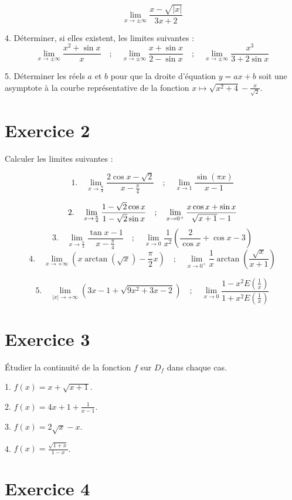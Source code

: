 \documentclass[12pt]{article}
\begin{document}
\[
\lim_{x \to \pm \infty} \frac{x - \sqrt{|x|}}{3x + 2}
\]

4. Déterminer, si elles existent, les limites suivantes :
\[
\lim_{x \to \pm \infty} \frac{x^2 + \sin x}{x} \quad ; \quad \lim_{x \to \pm\infty} \frac{x + \sin x}{2 - \sin x} \quad ; \quad \lim_{x \to \pm \infty} \frac{x^3}{3 + 2 \sin x}
\]

5. Déterminer les réels \( a \) et \( b \) pour que la droite d'équation \( y = ax + b \) soit une asymptote à la courbe représentative de la fonction \( x \mapsto \sqrt{x^2 + 4} - \frac{x}{\sqrt{2}} \).

\section*{Exercice 2}

Calculer les limites suivantes :

\[
1. \quad \lim_{x \to \frac{\pi}{4}} \frac{2 \cos x - \sqrt{2}}{x - \frac{\pi}{4}} \quad ; \quad \lim_{x \to 1} \frac{\sin(\pi x)}{x - 1}
\]

\[
2. \quad \lim_{x \to \frac{\pi}{4}} \frac{1 - \sqrt{2} \cos x}{1 - \sqrt{2} \sin x} \quad ; \quad \lim_{x \to 0^+} \frac{x \cos x + \sin x}{\sqrt{x + 1} - 1} \\
\]
\[
3. \quad \lim_{x \to \frac{\pi}{4}} \frac{\tan x - 1}{x - \frac{\pi}{4}} \quad ; \quad \lim_{x \to 0} \frac{1}{x^2} \left( \frac{2}{\cos x }+ \cos x - 3 \right)
\]
\[
4. \quad \lim_{x \to +\infty} \left( x \arctan (\sqrt{x}) - \frac{\pi}{2} x \right) \quad ; \quad \lim_{x \to 0^+} \frac{1}{x} \arctan \left( \frac{\sqrt{x}}{x + 1} \right)
\]

\[
5. \quad \lim_{|x| \to +\infty} \left( 3x - 1 + \sqrt{9x^2 + 3x - 2} \right) \quad ; \quad \lim_{x \to 0} \frac{1 - x^2 E \left( \frac{1}{x} \right)}{1 + x^2 E \left( \frac{1}{x} \right)} 
\]

\section*{Exercice 3}

Étudier la continuité de la fonction $f$ sur $D_f$ dans chaque cas.

1. $f(x) = x + \sqrt{x+1}$.

2. $f(x) = 4x + 1 + \frac{1}{x - 1}$.

3. $f(x) = 2\sqrt{x} - x$.

4. $f(x) = \frac{\sqrt{1 + x}}{1 - x}$.

\section*{Exercice 4}
\end{document}

